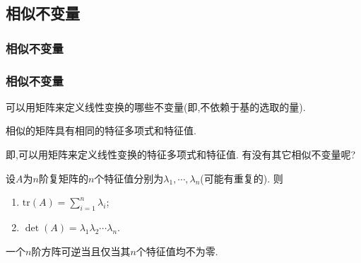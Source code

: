 \subsection{相似不变量}

\subsubsection{相似不变量}
\begin{frame}\frametitle{相似不变量}
可以用矩阵来定义线性变换的哪些不变量(即,不依赖于基的选取的量).
\pp
\begin{proposition}
相似的矩阵具有相同的特征多项式和特征值.
\end{proposition}
\pp
{}
\pp
即,可以用矩阵来定义线性变换的特征多项式和特征值.
\pp
有没有其它相似不变量呢?
\begin{theorem}
设$A$为$n$阶复矩阵的$n$个特征值分别为$\lambda_1,\cdots,\lambda_n$(可能有重复的).
\pp
则
\begin{enumerate}
\item $\mathrm{tr}(A)=\sum_{i=1}^{n}\lambda_i$;
\pp

\item $\det(A)=\lambda_1\lambda_2\cdots\lambda_n$.
\end{enumerate}
\end{theorem}
\pp
{}
\pp
\begin{corollary}
一个$n$阶方阵可逆当且仅当其$n$个特征值均不为零.
\end{corollary}
\end{frame}














